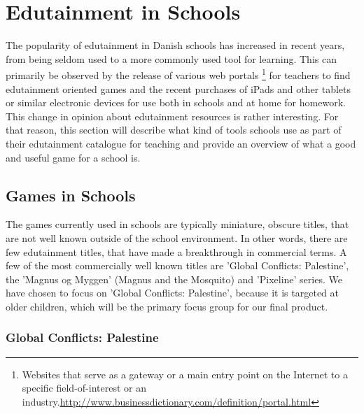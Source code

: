 \section{Edutainment in Schools}
\label{sec:eduinsch}
The popularity of edutainment in Danish schools has increased in recent years, from being seldom used to a more commonly used tool for learning. 
This can primarily be observed by the release of various web portals \footnote{Websites that serve as a gateway or a main entry point on the Internet to a specific field-of-interest or an industry.\url{http://www.businessdictionary.com/definition/portal.html}} for teachers to find edutainment oriented games and the recent purchases of iPads and other tablets or similar electronic devices for use both in schools and at home for homework.
This change in opinion about edutainment resources is rather interesting. For that reason, this section will describe what kind of tools schools use as part of their edutainment catalogue for teaching and provide an overview of what a good and useful game for a school is.


\subsection{Games in Schools}

The games currently used in schools are typically miniature, obscure titles, that are not well known outside of the school environment.
In other words, there are few edutainment titles, that have made a breakthrough in commercial terms.
A few of the most commercially well known titles are 'Global Conflicts: Palestine', the 'Magnus og Myggen' (Magnus and the Mosquito) and 'Pixeline' series.
We have chosen to focus on 'Global Conflicts: Palestine', because it is targeted at older children, which will be the primary focus group for our final product.

\subsubsection{Global Conflicts: Palestine}


